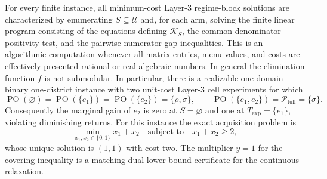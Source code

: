 For every finite instance, all minimum-cost Layer-3 regime-block solutions are characterized by enumerating \(S\subseteq\mathcal U\) and, for each arm, solving the finite linear program consisting of the equations defining \(\mathcal K_S\), the common-denominator positivity test, and the pairwise numerator-gap inequalities. This is an algorithmic computation whenever all matrix entries, menu values, and costs are effectively presented rational or real algebraic numbers. In general the elimination function \(f\) is not submodular. In particular, there is a realizable one-domain binary one-district instance with two unit-cost Layer-3 cell experiments for which
\[
\operatorname{PO}(\varnothing)=\operatorname{PO}(\{e_1\})
=\operatorname{PO}(\{e_2\})=\{\rho,\sigma\},
\qquad
\operatorname{PO}(\{e_1,e_2\})=\mathcal P_{\mathrm{full}}=\{\sigma\}.
\]
Consequently the marginal gain of \(e_2\) is zero at \(S=\varnothing\) and one at \(T_{\mathrm{exp}}=\{e_1\}\), violating diminishing returns. For this instance the exact acquisition problem is
\[
\min_{x_1,x_2\in\{0,1\}}x_1+x_2
\quad\text{subject to}\quad x_1+x_2\geq2,
\]
whose unique solution is \((1,1)\) with cost two. The multiplier \(y=1\) for the covering inequality is a matching dual lower-bound certificate for the continuous relaxation.